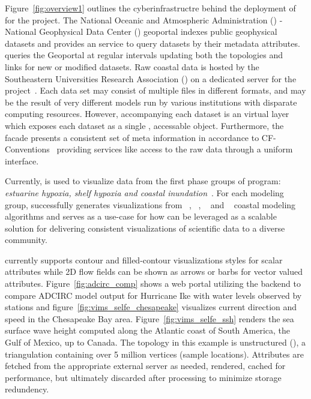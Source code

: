 Figure~\ref{fig:overview1} outlines the cyberinfrastructre behind the
deployment of \sciwms{} for the \comt{} project. The National Oceanic
and Atmospheric Administration (\noaa{}) - National Geophysical Data
Center (\ngdc{}) geoportal indexes public geophysical datasets and
provides an \ogc{} \csw{} service to query datasets by their metadata
attributes. \sciwms{} queries the \ngdc{} Geoportal at regular
intervals updating both the topologies and
\opendap{}~\cite{Cornillon03} links for new or modified datasets.
Raw coastal data is hosted by the Southeastern Universities Research
Association (\sura{}) on a dedicated server for the \comt{}
project~\cite{luettich12}. Each data set may consist of multiple files
in different formats, and may be the result of very different models
run by various institutions with disparate computing
resources. However, accompanying each dataset is an \ncml{} virtual
layer which exposes each dataset as a single \netcdf{}, \opendap{}
accessable object. Furthermore, the \ncml{} facade presents a
consistent set of meta information in accordance to
CF-Conventions~\cite{cf} providing services like \sciwms{} access to
the raw data through a uniform interface.

Currently, \Sciwms{} is used to visualize data from the first phase
groups of \ioos{} \comt{} program: {\em estuarine hypoxia, shelf
  hypoxia and coastal inundation}~\cite{luettich13}. For each modeling
group, \sciwms{} successfully generates visualizations from
\adcirc{}~\cite{adcirc}, \fvcom{}~\cite{chen06},
\selfe{}~\cite{zhang08} and \slosh{}~\cite{chen84} coastal modeling
algorithms and serves as a use-case for how \sciwms{} can be leveraged
as a scalable solution for delivering consistent visualizations of
scientific data to a diverse community. 

\sciwms{} currently supports contour and filled-contour visualizations
styles for scalar attributes while 2D flow fields can be shown as
arrows or barbs for vector valued
attributes. Figure~\ref{fig:adcirc_comp} shows a web portal utilizing
the \sciwms{} backend to compare ADCIRC model output for Hurricane Ike
with water levels observed by \noaa{} stations and
figure~\ref{fig:vims_selfe_chesapeake} visualizes current direction
and speed in the Chesapeake Bay area. Figure~\ref{fig:vims_selfe_ssh}
renders the sea surface wave height computed along the Atlantic coast
of South America, the Gulf of Mexico, up to Canada. The topology in
this example is unstructured (\ugrid{}), a triangulation containing
over 5 million vertices (sample locations). Attributes are fetched
from the appropriate external server as needed, rendered, cached for
performance, but ultimately discarded after processing to minimize
storage redundency.

